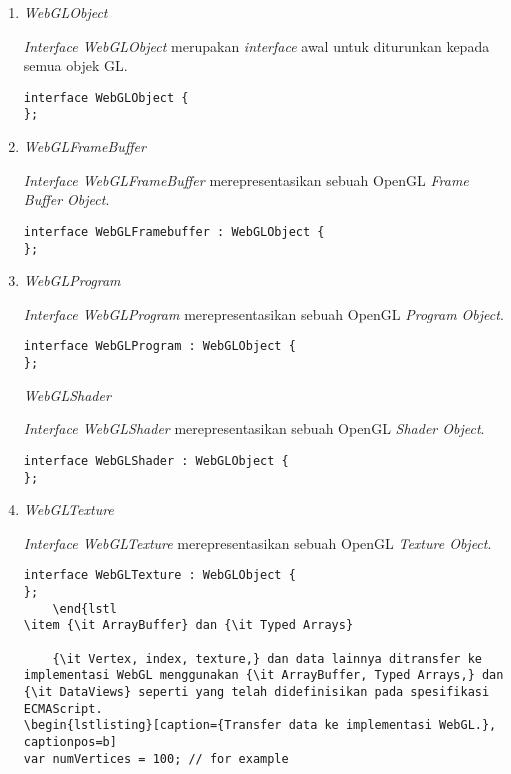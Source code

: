 \begin{enumerate}
\item {\it WebGLObject}

	{\it Interface WebGLObject} merupakan {\it interface} awal untuk diturunkan kepada semua objek GL.
	\begin{lstlisting}[caption={{\it Interface} awal pada WebGL.}, captionpos=b]
interface WebGLObject {
};
	\end{lstlisting}
	
\item {\it WebGLFrameBuffer}

	{\it Interface WebGLFrameBuffer} merepresentasikan sebuah OpenGL {\it Frame Buffer Object}.
	\begin{lstlisting}[caption={{\it Frame Buffer Object} pada OpenGL.}, captionpos=b]
interface WebGLFramebuffer : WebGLObject {
};
	\end{lstlisting}

\item {\it WebGLProgram}

	{\it Interface WebGLProgram} merepresentasikan sebuah OpenGL {\it Program Object}.
	\begin{lstlisting}[caption={{\it Program Object} pada OpenGL.}, captionpos=b]
interface WebGLProgram : WebGLObject {
};
	\end{lstlisting}
	
 {\it WebGLShader}

	{\it Interface WebGLShader} merepresentasikan sebuah OpenGL {\it Shader Object}.
	\begin{lstlisting}[caption={{\it Shader Object} pada OpenGL.}, captionpos=b]
interface WebGLShader : WebGLObject {
};
	\end{lstlisting}

\item {\it WebGLTexture}

	{\it Interface WebGLTexture} merepresentasikan sebuah OpenGL {\it Texture Object}.
	\begin{lstlisting}[caption={{\it Texture Object} pada OpenGL.}, captionpos=b]
interface WebGLTexture : WebGLObject {
};
	\end{lstl
\item {\it ArrayBuffer} dan {\it Typed Arrays}

	{\it Vertex, index, texture,} dan data lainnya ditransfer ke implementasi WebGL menggunakan {\it ArrayBuffer, Typed Arrays,} dan {\it DataViews} seperti yang telah didefinisikan pada spesifikasi ECMAScript.
\begin{lstlisting}[caption={Transfer data ke implementasi WebGL.}, captionpos=b]
var numVertices = 100; // for example


\end{lstlisting}
\end{enumerate}
